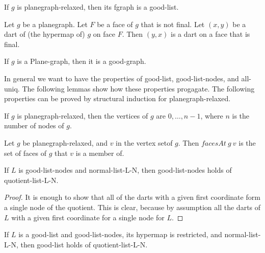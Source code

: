 \begin{lemma} 
If $g$ is planegraph-relaxed, then its fgraph is a good-list.
\end{lemma}  

\begin{lemma} 
Let $g$ be a planegraph.  Let $F$ be a face of $g$
that is not final.  Let $(x,y)$ be a dart of (the hypermap of) $g$ on face
$F$.
Then $(y,x)$ is a dart on a face that is final.
\end{lemma} 
 
\begin{lemma}
If $g$ is a Plane-graph, then it is a good-graph.
\end{lemma}

In general we want to have the properties of good-list, good-list-nodes, and all-uniq.
The following lemmas show how these properties progagate.
The following properties can be proved by structural induction
for planegraph-relaxed.


\begin{lemma}
If $g$ is planegraph-relaxed, then  the vertices of $g$ are $0,\ldots,n-1$, where
$n$ is the number of nodes of $g$. 
\end{lemma} 


\begin{lemma}
Let $g$ be planegraph-relaxed, and $v$ in the vertex setof $g$.
Then $facesAt~g~v$ is the set of faces of $g$ that $v$ is a member of.
\end{lemma}


\begin{lemma}  If $L$ is good-list-nodes and normal-list-L-N, then good-list-nodes
 holds of quotient-list-L-N.
\end{lemma}

\begin{proof}  It is enough to show that all of the darts with a given first coordinate form a single node of the quotient.
This is clear, because by assumption all the darts of $L$ with a given first coordinate for a single node for $L$.
\end{proof}

\begin{lemma}  If $L$ is a good-list and good-list-nodes, its hypermap is restricted,
and normal-list-L-N, then good-list holds of quotient-list-L-N.
\end{lemma}

